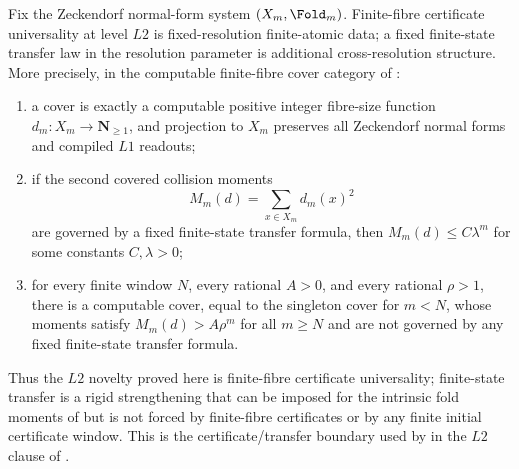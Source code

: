 \begin{theorem}
\label{thm:L2-finite-state-novelty-spine}
Fix the Zeckendorf normal-form system \((X_m,\Fold_m)\).  Finite-fibre
certificate universality at level \(L2\) is fixed-resolution finite-atomic data;
a fixed finite-state transfer law in the resolution parameter is additional
cross-resolution structure.  More precisely, in the computable finite-fibre
cover category of :
\begin{enumerate}
\item a cover is exactly a computable positive integer fibre-size function
  \(d_m:X_m\to\mathbf N_{\ge1}\), and projection to \(X_m\) preserves all
  Zeckendorf normal forms and compiled \(L1\) readouts;
\item if the second covered collision moments
  \[
    M_m(d)=\sum_{x\in X_m} d_m(x)^2
  \]
  are governed by a fixed finite-state transfer formula, then
  \(M_m(d)\le C\lambda^m\) for some constants \(C,\lambda>0\);
\item for every finite window \(N\), every rational \(A>0\), and every rational
  \(\rho>1\), there is a computable cover, equal to the singleton cover for
  \(m<N\), whose moments satisfy \(M_m(d)>A\rho^m\) for all \(m\ge N\) and are
  not governed by any fixed finite-state transfer formula.
\end{enumerate}
Thus the \(L2\) novelty proved here is finite-fibre certificate universality;
finite-state transfer is a rigid strengthening that can be imposed for the
intrinsic fold moments of  but is not
forced by finite-fibre certificates or by any finite initial certificate window.
This is the certificate/transfer boundary used by
 in the
\(L2\) clause of .
\end{theorem}

